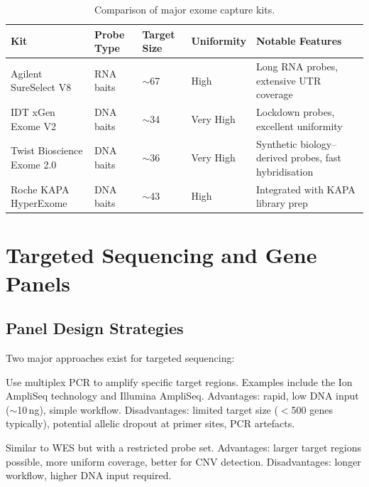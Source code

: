 \begin{table}[htbp]
\centering
\caption{Comparison of major exome capture kits.}
\label{tab:capture_kits}
\footnotesize
\begin{tabularx}{\textwidth}{@{}p{2.4cm} X p{2.2cm} p{1.7cm} p{3.8cm}@{}}
\toprule
\textbf{Kit} & \textbf{Probe Type} & \textbf{Target Size} & \textbf{Uniformity} & \textbf{Notable Features} \\
\midrule
Agilent SureSelect V8 & RNA baits & $\sim$67\megabase{} & High & Long RNA probes, extensive UTR coverage \\
IDT xGen Exome V2 & DNA baits & $\sim$34\megabase{} & Very High & Lockdown probes, excellent uniformity \\
Twist Bioscience Exome 2.0 & DNA baits & $\sim$36\megabase{} & Very High & Synthetic biology--derived probes, fast hybridisation \\
Roche KAPA HyperExome & DNA baits & $\sim$43\megabase{} & High & Integrated with KAPA library prep \\
\bottomrule
\end{tabularx}
\end{table}

\section{Targeted Sequencing and Gene Panels}
\label{sec:panels}

\subsection{Panel Design Strategies}

Two major approaches exist for targeted sequencing:

\begin{description}[style=nextline]
  \item[Amplicon-based panels] Use multiplex PCR to amplify specific target regions. Examples include the Ion AmpliSeq technology and Illumina AmpliSeq. Advantages: rapid, low DNA input ($\sim$10\,ng), simple workflow. Disadvantages: limited target size ($<$500 genes typically), potential allelic dropout at primer sites, PCR artefacts.
  \item[Hybridisation capture--based panels] Similar to WES but with a restricted probe set. Advantages: larger target regions possible, more uniform coverage, better for CNV detection. Disadvantages: longer workflow, higher DNA input required.
\end{description}


